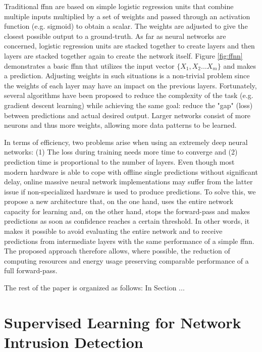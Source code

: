 \documentclass[conference]{IEEEtran}
\begin{document}
Traditional \gls{ffnn} are based on simple logistic regression units that combine multiple inputs multiplied by a set of weights and passed through an activation function (e.g. sigmoid) to obtain a scalar. The weights are adjusted to give the closest possible output to a ground-truth. As far as neural networks are concerned, logistic regression units are stacked together to create layers and then layers are stacked together again to create the network itself. Figure \ref{fig:ffnn} demonstrates a basic \gls{ffnn} that utilizes the input vector $\lbrace X_{1}, X_{2} ... X_{m} \rbrace$ and makes a prediction. Adjusting weights in such situations is a non-trivial problem since the weights of each layer may have an impact on the previous layers. Fortunately, several algorithms have been proposed to reduce the complexity of the task (e.g. gradient descent learning) while achieving the same goal: reduce the "gap" (loss) between predictions and actual desired output. Larger networks consist of more neurons and thus more weights, allowing more data patterns to be learned.

In terms of efficiency, two problems arise when using an extremely deep neural networks: (1) The loss during training needs more time to converge and (2) prediction time is proportional to the number of layers. Even though most modern hardware is able to cope with offline single predictions without significant delay, online massive neural network implementations may suffer from the latter issue if non-specialized hardware is used to produce predictions. 
To solve this, we propose a new architecture that, on the one hand, uses the entire network capacity for learning and, on the other hand, stops the forward-pass and makes predictions as soon as confidence reaches a certain threshold. In other words, it makes it possible to avoid evaluating the entire network and to receive predictions from intermediate layers with the same performance of a simple \gls{ffnn}. The proposed approach therefore allows, where possible, the reduction of computing resources and energy usage preserving comparable performance of a full forward-pass.

The rest of the paper is organized as follows: In Section ...
 
\section{Supervised Learning for Network Intrusion Detection}
\end{document}
